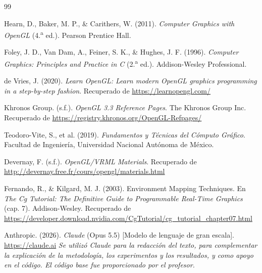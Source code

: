
\renewcommand{\refname}{Referencias Bibliográficas}
\begin{thebibliography}{99}

Hearn, D., Baker, M. P., \& Carithers, W. (2011). \textit{Computer Graphics with OpenGL} (4.\textsuperscript{a} ed.). Pearson Prentice Hall.

Foley, J. D., Van Dam, A., Feiner, S. K., \& Hughes, J. F. (1996). \textit{Computer Graphics: Principles and Practice in C} (2.\textsuperscript{a} ed.). Addison-Wesley Professional.

de Vries, J. (2020). \textit{Learn OpenGL: Learn modern OpenGL graphics programming in a step-by-step fashion}. Recuperado de \url{https://learnopengl.com/}

Khronos Group. (s.f.). \textit{OpenGL 3.3 Reference Pages}. The Khronos Group Inc. Recuperado de \url{https://registry.khronos.org/OpenGL-Refpages/}

Teodoro-Vite, S., et al. (2019). \textit{Fundamentos y Técnicas del Cómputo Gráfico}. Facultad de Ingeniería, Universidad Nacional Autónoma de México.

Devernay, F. (s.f.). \textit{OpenGL/VRML Materials}. Recuperado de \url{http://devernay.free.fr/cours/opengl/materials.html}

Fernando, R., \& Kilgard, M. J. (2003). Environment Mapping Techniques. En \textit{The Cg Tutorial: The Definitive Guide to Programmable Real-Time Graphics} (cap. 7). Addison-Wesley. Recuperado de \url{https://developer.download.nvidia.com/CgTutorial/cg_tutorial_chapter07.html}

Anthropic. (2026). \textit{Claude} (Opus 5.5) [Modelo de lenguaje de gran escala]. \url{https://claude.ai}
\textit{Se utilizó Claude para la redacción del texto, para complementar la explicación de la metodología, los experimentos y los resultados, y como apoyo en el código. El código base fue proporcionado por el profesor.}

\end{thebibliography}

